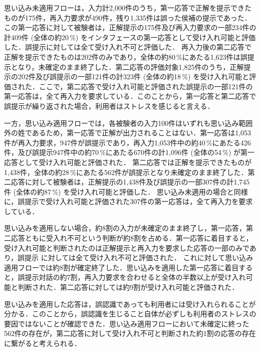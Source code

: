 思い込み未適用フローは，入力計2,000件のうち，第一応答で正解を提示できたものが175件，再入力要求が490件，残り1,335件は誤った侯補の提示であった．この第一応答に対して被験者は，正解提示の175件及び再入力要求の一部234件の計409件 (全体の約20\,\%) をインタフェースの第一応答として受け入れ可能と評価した．誤提示に対しては全て受け入れ不可と評価した．
再入力後の第二応答で正解を提示できたものは202件のみであり，全体の約80\,\%にあたる1,623件は誤提示となり，未確定のまま終了した．第二応答の評価対象1,825件のうち，正解提示の202件及び誤提示の一部121件の計323件 (全体の約18\,\%) を受け入れ可能と評価された．ここで，第二応答で受け入れ可能と評価された誤提示の一部121件の第一応答は，全て再入力を要求している．このことから，第一応答と第二応答で誤提示が繰り返された場合，利用者はストレスを感じると言える．

一方，思い込み適用フローでは，各被験者の入力100件はいずれも思い込み範囲外の姓であるため，第一応答で正解が出力されることはない．第一応答は1,053件が再入力要求，947件が誤提示であり，再入力1,053件中の約40\,\%にあたる426件，及び誤提示947件中の約70\,\%にあたる670件の計1,096件 (全体の54\,\%) が第一応答として受け入れ可能と評価された．
第二応答では正解を提示できたものが1,438件，全体の約28\,\%にあたる562件が誤提示となり未確定のまま終了した．第二応答に対して被験者は，正解提示の1,438件及び誤提示の一部307件の計1,745件 (全体の約87\,\%) を受け入れ可能と評価した．
思い込み未適用の場合と同様に，誤提示で受け入れ可能と評価された307件の第一応答は，全て再入力を要求している．

思い込みを適用しない場合，約8割の入力が未確定のまま終了し，第一応答，第二応答ともに受入れ不可という判断が約8割を占める．第一応答に着目すると，受け入れ可能と判断されたのは正解提示と再入力を要求した応答の一部のみであり，誤提示
に対しては全て受け入れ不可と評価された．
これに対して思い込み適用フローでは約8割が確定終了した．思い込みを適用した第一応答に着目すると，誤提示対話の約7割，再入力要求を合わせると全体の半数以上が受け入れ可能と判断された．第二応答に対しては約9割が受け入れ可能と評価された．

思い込みを適用した応答は，誤認識であっても利用者には受け入れられることが分かる．このことから，誤認識を生じること自体が必ずしも利用者のストレスの要因ではないことが確認できた．思い込み適用フローにおいて未確定に終った562件の存在が，第二応答に対して受け入れ不可と判断された約1割の応答の存在に繋がると考えられる．

